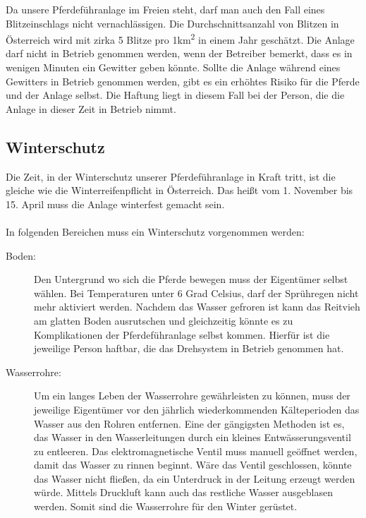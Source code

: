 Da unsere Pferdeführanlage im Freien steht, darf man auch den Fall eines Blitzeinschlags nicht vernachlässigen. 
Die Durchschnittsanzahl von Blitzen in Österreich wird mit zirka 5 Blitze pro 1km\textsuperscript{2} in einem Jahr geschätzt. 
Die Anlage darf nicht in Betrieb genommen werden, wenn der Betreiber bemerkt, 
dass es in wenigen Minuten ein Gewitter geben könnte.
Sollte die Anlage während eines Gewitters in Betrieb genommen werden, 
gibt es ein erhöhtes Risiko für die Pferde und der Anlage selbst.
Die Haftung liegt in diesem Fall bei der Person, die die Anlage in dieser Zeit in Betrieb nimmt.

\subsection{Winterschutz}
\label{sec:winterschutz}

Die Zeit, in der Winterschutz unserer Pferdeführanlage in Kraft tritt, ist die gleiche wie die Winterreifenpflicht in Österreich. Das heißt vom 1. November bis 15. April muss die Anlage winterfest gemacht sein. 
\\
\\
In folgenden Bereichen muss ein Winterschutz vorgenommen werden:
\begin{description}
\item[Boden:]
Den Untergrund wo sich die Pferde bewegen muss der Eigentümer selbst wählen. Bei Temperaturen unter 6 Grad Celsius, darf der Sprühregen nicht mehr aktiviert werden. Nachdem das Wasser gefroren ist kann das Reitvieh am glatten Boden ausrutschen und gleichzeitig könnte es zu Komplikationen der Pferdeführanlage selbst kommen. Hierfür ist die jeweilige Person haftbar, die das Drehsystem in Betrieb genommen hat.

\item[Wasserrohre:]

Um ein langes Leben der Wasserrohre gewährleisten zu können, muss der jeweilige Eigentümer vor den jährlich wiederkommenden Kälteperioden das Wasser aus den Rohren entfernen. Eine der gängigsten Methoden ist es, das Wasser in den Wasserleitungen durch ein kleines Entwässerungsventil zu entleeren. Das elektromagnetische Ventil muss manuell geöffnet werden, damit das Wasser zu rinnen beginnt. Wäre das Ventil geschlossen, könnte das Wasser nicht fließen, da ein Unterdruck in der Leitung erzeugt werden würde. Mittels Druckluft kann auch das restliche Wasser ausgeblasen werden. Somit sind die Wasserrohre für den Winter gerüstet.

\end{description}

